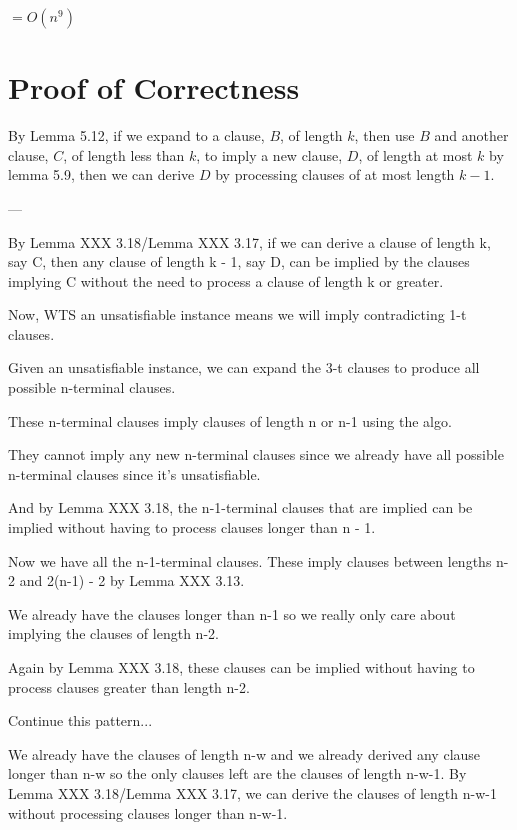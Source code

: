 \documentclass[manuscript]{acmart}
\begin{document}
    $= O(n^9)$

    \section{Proof of Correctness}

    By Lemma 5.12, if we expand to a clause, $B$, of length $k$, then
    use $B$ and another clause, $C$, of length less than $k$, to imply
    a new clause, $D$, of length at most $k$ by lemma 5.9, then
    we can derive $D$ by processing clauses of at most length $k-1$.



    ---

    By Lemma XXX 3.18/Lemma XXX 3.17, if we can derive a clause of length k, say C, then
    any clause of length k - 1, say D, can be implied by 
    the clauses implying C without the need to process a clause of length 
    k or greater.

    Now, WTS an unsatisfiable instance means we will imply contradicting 1-t clauses.

    Given an unsatisfiable instance, we can expand the 3-t clauses to produce
    all possible n-terminal clauses.

    These n-terminal clauses imply clauses of length n or n-1 using the algo.

    They cannot imply any new n-terminal clauses since we already have all possible
    n-terminal clauses since it's unsatisfiable.

    And by Lemma XXX 3.18, the n-1-terminal clauses that are implied can be implied
    without having to process clauses longer than n - 1.

    Now we have all the n-1-terminal clauses. These imply clauses between
    lengths n-2 and 2(n-1) - 2 by Lemma XXX 3.13.

    We already have the clauses longer than n-1 so we really only care about
    implying the clauses of length n-2. 

    Again by Lemma XXX 3.18, these clauses can be implied without having to
    process clauses greater than length n-2.

    Continue this pattern...

    We already have the clauses of length n-w and we already derived any clause
    longer than n-w so the only clauses left are the clauses of length n-w-1.
    By Lemma XXX 3.18/Lemma XXX 3.17, we can derive the clauses of length n-w-1 without
    processing clauses longer than n-w-1.
\end{document}
